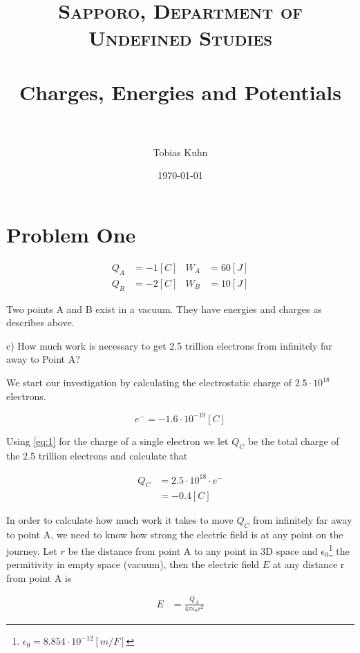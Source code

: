 \documentclass[paper=a4, fontsize=11pt]{scrartcl} %
\title{	
\normalfont \normalsize 
\textsc{Sapporo, Department of Undefined Studies} \\ [25pt] %
\horrule{0.5pt} \\[0.4cm] %
\huge Charges, Energies and Potentials\\ %
\horrule{2pt} \\[0.5cm] %
}
\author{Tobias Kuhn} %
\date{\normalsize\today} %
\numberwithin{equation}{section} %
\numberwithin{figure}{section} %
\numberwithin{table}{section} %
\begin{document}
\maketitle %


\section{ Problem One }

\begin{align} 
Q_A &= -1[C] & W_A &= 60[J] \\
Q_B &= -2[C] & W_B &= 10[J] 
\end{align}

Two points A and B exist in a vacuum. They have energies and charges as describes above.

c) How much work is necessary to get 2.5 trillion electrons from infinitely far away to Point A?

We start our investigation by calculating the electrostatic charge of $2.5 \cdot 10^{18}$ electrons.

\begin{equation} \label{eq:1}
e^- = -1.6 \cdot 10^{-19} [C]
\end{equation}

Using \ref{eq:1} for the charge of a single electron we let $Q_C$ be the total charge of the 2.5 trillion electrons and calculate that

\begin{align} \label{eq:2}
Q_C &= 2.5 \cdot 10^{18} \cdot e^- \\ &= -0.4 [C]
\end{align}

In order to calculate how much work it takes to move $Q_C$ from infinitely far away to point A,
we need to know how strong the electric field is at any point on the journey. 
Let $r$ be the distance from point A to any point in 3D space and $\epsilon_0$\footnote{$\epsilon_0 = 8.854 \cdot 10 ^ {-12} [m/F] $} the permitivity in empty space (vacuum),
then the electric field $E$ at any distance r from point A is 

\begin{align} \label{eq:3}
E &= \frac{Q_A}{4 \pi \epsilon_0 r^2}
\end{align}
\end{document}

